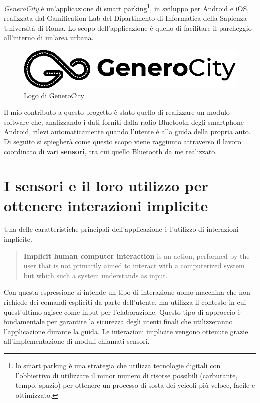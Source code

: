 \textit{GeneroCity} è un'applicazione di smart parking\footnote{lo smart parking è una strategia che utilizza tecnologie digitali con l'obbiettivo di utilizzare il minor numero di risorse possibili (carburante, tempo, spazio) per ottenere un processo di sosta dei veicoli più veloce, facile e ottimizzato.\cite{ref:smartparking}}, in sviluppo per Android e iOS, realizzata dal Gamification Lab del Dipartimento di Informatica della Sapienza Università di Roma. Lo scopo dell'applicazione è quello di facilitare il parcheggio all’interno di un’area urbana\cite{ref:generocity}.

\begin{figure}[h]
    \centering
    \vspace*{1\baselineskip}
    \includegraphics[width=0.5\linewidth]{images/gc_logo.png}
    \caption{Logo di GeneroCity}
    \label{fig:gc_logo}
\end{figure}

Il mio contributo a questo progetto è stato quello di realizzare un modulo software che, analizzando i dati forniti dalla radio Bluetooth degli smartphone Android, rilevi automaticamente quando l'utente è alla guida della propria auto. Di seguito si spiegherà come questo scopo viene raggiunto attraverso il lavoro coordinato di vari \textbf{sensori}, tra cui quello Bluetooth da me realizzato.

\section{I sensori e il loro utilizzo per ottenere interazioni implicite}
Una delle caratteristiche principali dell'applicazione è l'utilizzo di interazioni implicite.
\begin{quote}
\textbf{Implicit human computer interaction} is an action,
performed by the user that is not primarily aimed
to interact with a computerized system but which
such a system understands as input.\cite{ref:implicit-interaction}
\end{quote}
Con questa espressione si intende un tipo di interazione uomo-macchina che non richiede dei comandi espliciti da parte dell'utente, ma utilizza il contesto in cui quest'ultimo agisce come input per l'elaborazione\cite{ref:implicit-interaction-2}. Questo tipo di approccio è fondamentale per garantire la sicurezza degli utenti finali che utilizzeranno l'applicazione durante la guida. Le interazioni implicite vengono ottenute grazie all'implementazione di moduli chiamati sensori.

